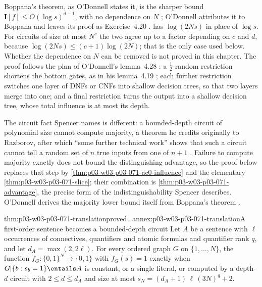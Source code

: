 Boppana's theorem, as O'Donnell states it, is the sharper bound
\(\mathbf I[f]\leq O(\log s)^{d-1}\), with no dependence on \(N\)
\cite[thm.~4.30, p.~106]{ODonnell2021AnalysisBooleanArxiv}; O'Donnell
attributes it to Boppana \cite[p.~111]{ODonnell2021AnalysisBooleanArxiv} and
leaves its proof as Exercise~4.20
\cite[p.~106]{ODonnell2021AnalysisBooleanArxiv}.
 has \(\log(2Ns)\) in place of
\(\log s\).  For circuits of size at most \(N^c\) the two agree up to a
factor depending on \(c\) and \(d\), because \(\log(2Ns)\leq(c+1)\log(2N)\);
that is the only case used below.  Whether the dependence on \(N\) can be
removed is not proved in this chapter.  The proof follows the plan of
O'Donnell's lemma~4.28 \cite[pp.~104--106]{ODonnell2021AnalysisBooleanArxiv}:
a \(\frac12\)-random restriction shortens the bottom gates, as in his
lemma~4.19 \cite[p.~99]{ODonnell2021AnalysisBooleanArxiv}; each further
restriction switches one layer of DNFs or CNFs into shallow decision trees,
so that two layers merge into one; and a final restriction turns the output
into a shallow decision tree, whose total influence is at most its depth.

The circuit fact Spencer names is different: a bounded-depth circuit of
polynomial size cannot compute majority, a theorem he credits originally to
Razborov, after which ``some further technical work'' shows that such a
circuit cannot tell a random set of \(n\) true inputs from one of \(n+1\)
\cite[p.~26]{Spencer2007LogicRandomStructuresAuthor}.  Failure to compute
majority exactly does not bound the distinguishing advantage, so the proof
below replaces that step by \cref{thm:p03-w03-p03-071-ac0-influence} and the
elementary \cref{thm:p03-w03-p03-071-slice}; their combination is
\cref{thm:p03-w03-p03-071-advantage}, the precise form of the
indistinguishability Spencer describes.  O'Donnell derives the majority
lower bound itself from Boppana's theorem
\cite[p.~107]{ODonnell2021AnalysisBooleanArxiv}.

\begin{hblemma}{thm:p03-w03-p03-071-translation}{proved=annex:p03-w03-p03-071-translation}{A first-order sentence becomes a bounded-depth circuit}
Let \(A\) be a sentence with \(\ell\) occurrences of connectives,
quantifiers and atomic formulas and quantifier rank \(q\), and let
\(d_A=\max(2,2\ell)\).  For every ordered graph \(G\) on
\(\{1,\ldots,N\}\), the function \(f_{G}:\{0,1\}^N\to\{0,1\}\) with
\(f_G(s)=1\) exactly when \(G|\{b:s_b=1\}\entails A\) is constant, or a
single literal, or computed by a depth-\(d\) circuit with \(2\leq d\leq d_A\)
and size at most \(s_N=(d_A+1)\,\ell\,(3N)^{q}+2\).
\end{hblemma}

